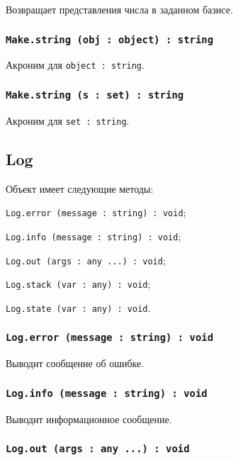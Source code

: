 Возвращает представления числа в заданном базисе.

\subsubsection{\lstinline|Make.string (obj : object) : string|}

Акроним для \lstinline|object : string|.

\subsubsection{\lstinline|Make.string (s : set) : string|}

Акроним для \lstinline|set : string|.

\subsection{{\color{orange} Log}}

Объект \logtype{} имеет следующие методы:
\begin{icItems}
	\item \lstinline|Log.error (message : string) : void|;
	\item \lstinline|Log.info (message : string) : void|;
	\item \lstinline|Log.out (args : any ...) : void|;
	\item \lstinline|Log.stack (var : any) : void|;
	\item \lstinline|Log.state (var : any) : void|.
\end{icItems}

\subsubsection{\lstinline|Log.error (message : string) : void|}

Выводит сообщение об ошибке.

\subsubsection{\lstinline|Log.info (message : string) : void|}

Выводит информационное сообщение.

\subsubsection{\lstinline|Log.out (args : any ...) : void|}

